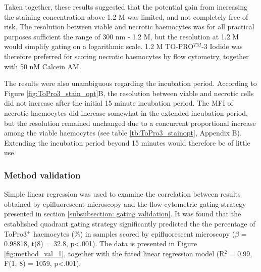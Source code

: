 Taken together, these results suggested that the potential gain from increasing the staining concentration above 1.2 \micro M was limited, and not completely free of risk. The resolution between viable and necrotic haemocytes was for all practical purposes sufficient the range of 300 nm - 1.2 \micro M, but the resolution at 1.2 \micro M would simplify gating on a logarithmic scale. 1.2 \micro M TO-PRO$^{TM}$-3 Iodide was therefore preferred for scoring necrotic haemocytes by flow cytometry, together with 50 nM Calcein AM.

The results were also unambiguous regarding the incubation period. According to Figure \ref{fig:ToPro3_stain_opt}B, the resolution between viable and necrotic cells did not increase after the initial 15 minute incubation period. The MFI of necrotic haemocytes did increase somewhat in the extended incubation period, but the resolution remained unchanged due to a concurrent proportional increase among the viable haemocytes (see table \ref{tb:ToPro3_stainopt}, Appendix B). Extending the incubation period beyond 15 minutes would therefore be of little use.

\subsubsection{Method validation}
Simple linear regression was used to examine the correlation between results obtained by epifluorescent microscopy and the flow cytometric gating strategy presented in section \ref{subsubsection: gating validation}. It was found that the established quadrant gating strategy significantly predicted the the percentage of ToPro3$^{+}$ haemocytes (\%) in samples scored by epifluorescent microscopy ($\beta$ = 0.98818, t(8) = 32.8, p<.001). The data is presented in Figure \ref{fig:method_val_1}, together with the fitted linear regression model (R$^{2}$ = 0.99, F(1, 8) = 1059, p<.001).

